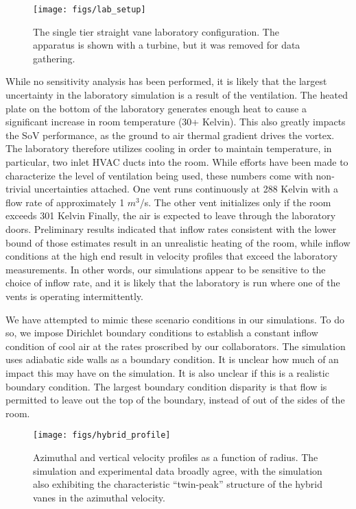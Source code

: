   \begin{figure}[!htb]
    \begin{center}
     \texttt{[image: figs/lab\_setup]}
     \caption{The single tier straight vane laboratory configuration. The
     apparatus is shown with a turbine, but it was removed for data
     gathering.}
     \label{fig:lab_image}
    \end{center}
  \end{figure}

While no sensitivity analysis has been performed, it is likely that the
largest uncertainty in the laboratory simulation is a result of the
ventilation. The heated plate on the bottom of the laboratory
generates enough heat to cause a significant increase in room
temperature (30+ Kelvin). This also greatly impacts the SoV
performance, as the ground to air thermal gradient drives the
vortex. The laboratory therefore utilizes cooling in order to maintain
temperature, in particular, two inlet HVAC ducts into the room. While
efforts have been made to characterize the level of ventilation being
used, these numbers come with non-trivial uncertainties attached. One
vent runs continuously at 288 Kelvin with a flow rate of approximately 1 
$m^3$/s.
The other vent initializes only if the room exceeds 301 Kelvin
Finally, the air is expected to leave through the laboratory doors.
Preliminary results indicated that 
inflow rates consistent with the lower bound of those estimates result in an
unrealistic heating of the room, while inflow conditions at the high end
result in velocity profiles that exceed the laboratory measurements. In
other words, our simulations appear to be sensitive to the choice of
inflow rate, and it is likely that the laboratory is run where one of
the vents is operating intermittently. 

We have attempted to mimic these scenario conditions in our
simulations. To do so, we impose Dirichlet boundary conditions to
establish a constant inflow condition of cool air at the rates 
proscribed by our collaborators. The simulation uses adiabatic side
walls as a boundary condition. It is unclear how much of an impact this
may have on the simulation. It is also unclear if this is a realistic
boundary condition. The largest boundary condition disparity is that
flow is permitted to leave out the top of the boundary, instead of out
of the sides of the room. 

  \begin{figure}[!htb]
    \begin{center}
     \texttt{[image: figs/hybrid\_profile]}
     \caption{Azimuthal and vertical velocity profiles as a function of
     radius. The simulation and experimental data broadly agree, with
     the simulation also exhibiting the characteristic ``twin-peak''
     structure of the hybrid vanes in the azimuthal velocity. }
     \label{fig:lab}
    \end{center}
  \end{figure}


